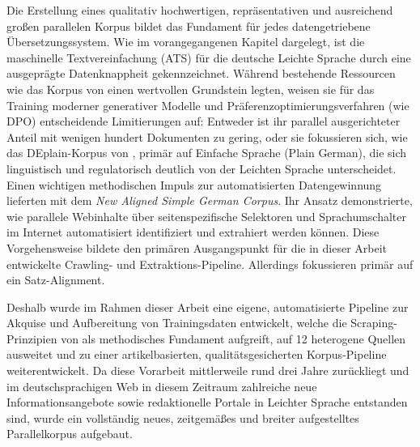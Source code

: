 Die Erstellung eines qualitativ hochwertigen, repräsentativen und ausreichend großen parallelen Korpus bildet das Fundament für jedes datengetriebene Übersetzungssystem. Wie im vorangegangenen Kapitel dargelegt, ist die maschinelle Textvereinfachung (ATS) für die deutsche Leichte Sprache durch eine ausgeprägte Datenknappheit gekennzeichnet. Während bestehende Ressourcen wie das Korpus von \citet{battisti2020corpus} einen wertvollen Grundstein legten, weisen sie für das Training moderner generativer Modelle und Präferenzoptimierungsverfahren (wie DPO) entscheidende Limitierungen auf: Entweder ist ihr parallel ausgerichteter Anteil mit wenigen hundert Dokumenten zu gering, oder sie fokussieren sich, wie das DEplain-Korpus von \citet{stodden2023deplain}, primär auf Einfache Sprache (Plain German), die sich linguistisch und regulatorisch deutlich von der Leichten Sprache unterscheidet. Einen wichtigen methodischen Impuls zur automatisierten Datengewinnung lieferten \citet{toborek2023new} mit dem \textit{New Aligned Simple German Corpus}. Ihr Ansatz demonstrierte, wie parallele Webinhalte über seitenspezifische Selektoren und Sprachumschalter im Internet automatisiert identifiziert und extrahiert werden können. Diese Vorgehensweise bildete den primären Ausgangspunkt für die in dieser Arbeit entwickelte Crawling- und Extraktions-Pipeline. Allerdings fokussieren \citet{toborek2023new} primär auf ein Satz-Alignment.

Deshalb wurde im Rahmen dieser Arbeit eine eigene, automatisierte Pipeline zur Akquise und Aufbereitung von Trainingsdaten entwickelt, welche die Scraping-Prinzipien von \citet{toborek2023new} als methodisches Fundament aufgreift, auf 12 heterogene Quellen ausweitet und zu einer artikelbasierten, qualitätsgesicherten Korpus-Pipeline weiterentwickelt. Da diese Vorarbeit mittlerweile rund drei Jahre zurückliegt und im deutschsprachigen Web in diesem Zeitraum zahlreiche neue Informationsangebote sowie redaktionelle Portale in Leichter Sprache entstanden sind, wurde ein vollständig neues, zeitgemäßes und breiter aufgestelltes Parallelkorpus aufgebaut.

